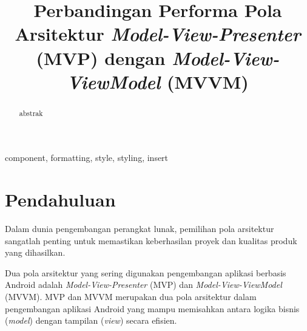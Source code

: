 \documentclass[conference]{IEEEtran}
\begin{document}
	
	\title{Perbandingan Performa Pola Arsitektur \textit{Model-View-Presenter} (MVP) dengan \textit{Model-View-ViewModel} (MVVM)\\
	}
	
	\author{
		\and
		\and
		\and
	}
	
	\maketitle
	
	\begin{abstract}
		abstrak
	\end{abstract}
	
	\begin{IEEEkeywords}
		component, formatting, style, styling, insert
	\end{IEEEkeywords}
	
	\section{Pendahuluan}
	Dalam dunia pengembangan perangkat lunak, pemilihan pola arsitektur sangatlah penting untuk memastikan keberhasilan proyek dan kualitas produk yang dihasilkan. 
	
	Dua pola arsitektur yang sering digunakan pengembangan aplikasi berbasis Android adalah \textit{Model-View-Presenter} (MVP) dan \textit{Model-View-ViewModel} (MVVM). MVP dan MVVM merupakan dua pola arsitektur dalam pengembangan aplikasi Android yang mampu memisahkan antara logika bisnis (\textit{model}) dengan tampilan (\textit{view}) secara efisien. 
	
\end{document}

